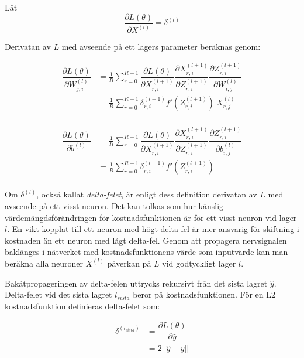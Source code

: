 \documentclass[a4paper,11pt,twoside]{article}
\newcommand*{\pd}[2]{\ensuremath{\dfrac{\partial #1}{\partial #2}}}
\newcommand*{\inpd}[2]{\ensuremath{\frac{\partial #1}{\partial #2}}}
\begin{document}
Låt
\begin{equation}
\inpd{L(\theta)}{X^{(l)}} = \delta^{(l)}
\end{equation}

Derivatan av $L$ med avseende på ett lagers parameter beräknas genom:

\begin{equation}\label{dLdW_FCC}
\begin{split}
\pd{L(\theta)}{W^{(l)}_{j,i}} 
	& = \frac{1}{R}\sum^{R-1}_{r=0} \pd{L(\theta)}{X^{(l+1)}_{r,i}} \pd{X^{(l+1)}_{r,i}}{Z^{(l+1)}_{r,i}} \pd{Z^{(l+1)}_{r,i}}{W^{(l)}_{i,j}} \\
	& = \frac{1}{R}\sum^{R-1}_{r=0} \delta^{(l+1)}_{r,i} f'(Z^{(l+1)}_{r,i}) \ X^{(l)}_{r,j}\\
\end{split}
\end{equation}

\begin{equation}
\begin{split}
\pd{L(\theta)}{b^{(l)}} 
	& = \frac{1}{R}\sum^{R-1}_{r=0} \pd{L(\theta)}{X^{(l+1)}_{r,i}} \pd{X^{(l+1)}_{r,i}}{Z^{(l+1)}_{r,i}} \pd{Z^{(l+1)}_{r,i}}{b^{(l)}_{i,j}} \\
	& = \frac{1}{R}\sum^{R-1}_{r=0} \delta^{(l+1)}_{r,i} f'(Z^{(l+1)}_{r,i}) \\
\end{split}
\end{equation}

Om $\delta^{(l)}$, också kallat \textit{delta-felet}, är enligt dess definition derivatan av $L$ med avseende på ett visst neuron. Det kan tolkas som hur känslig värdemängdsförändringen för kostnadsfunktionen är för ett visst neuron vid lager $l$. En vikt kopplat till ett neuron med högt delta-fel är mer ansvarig för skiftning i kostnaden än ett neuron med lågt delta-fel. Genom att propagera nervsignalen baklänges i nätverket med kostnadsfunktionens värde som inputvärde kan man beräkna alla neuroner $X^{(l)}$ påverkan på $L$ vid godtyckligt lager $l$. \cite{cs231n}

Bakåtpropageringen av delta-felen uttrycks rekursivt från det sista lagret $\hat{y}$. Delta-felet vid det sista lagret $l_{sista}$ beror på kostnadsfunktionen. För en L2 kostnadsfunktion definieras delta-felet som: \cite{cs231n}

\begin{equation}
\begin{split}
\delta^{(l_{sista})}
	& = \pd{L(\theta)}{\hat{y}}  \\
	& = 2 ||\hat{y}-y||
\end{split}
\end{equation}
\end{document}
